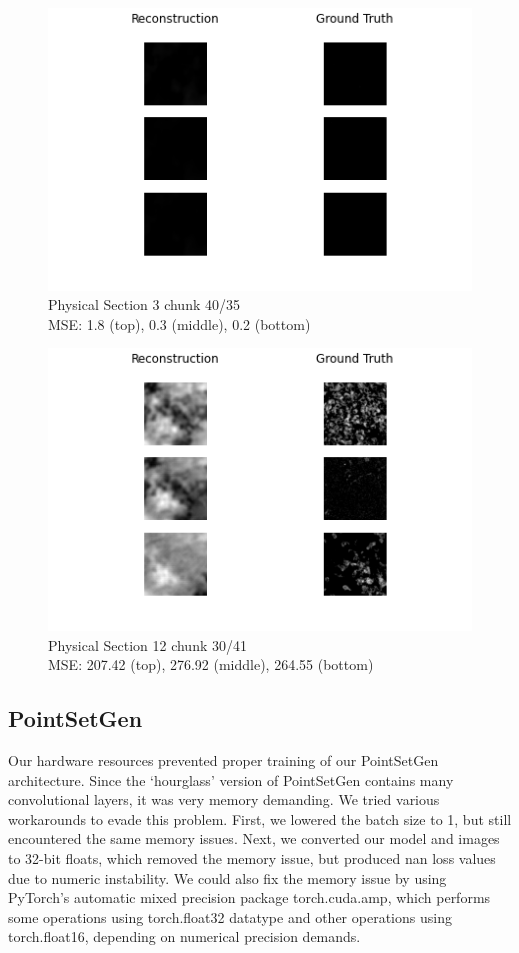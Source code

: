 \documentclass[10pt,twocolumn,letterpaper]{article}
\begin{document}
\begin{figure}
	\centering
	\captionsetup{justification=centering}
		\hspace*{-0.8cm}	
		\includegraphics[scale=0.60]{../figures/10_40_35.png}
	\caption{Physical Section 3 chunk 40/35\\ MSE: 1.8 (top), 0.3 (middle), 0.2 (bottom)}		
\end{figure}


\begin{figure}
	\centering
	\captionsetup{justification=centering}
		\hspace*{-0.8cm}
		\includegraphics[scale=0.60]{../figures/12_30_41.png}
	\caption{Physical Section 12 chunk 30/41\\ MSE: 207.42 (top), 276.92 (middle), 264.55 (bottom)}		
\end{figure}

\newpage

\subsection{PointSetGen}
Our hardware resources prevented proper training of our PointSetGen architecture. Since the `hourglass' version of PointSetGen contains many convolutional layers, it was very memory demanding. We tried various workarounds to evade this problem. First, we lowered the batch size to 1, but still encountered the same memory issues. Next, we converted our model and images to 32-bit floats, which removed the memory issue, but produced nan loss values due to numeric instability. We could also fix the memory issue by using PyTorch's automatic mixed precision package torch.cuda.amp, which performs some operations using torch.float32 datatype and other operations using torch.float16, depending on numerical precision demands. 
\end{document}
